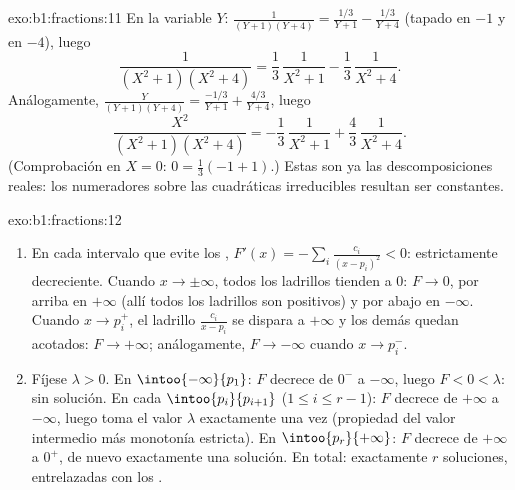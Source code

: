 \begin{solution}{exo:b1:fractions:11}
En la variable $Y$: $\frac1{(Y+1)(Y+4)} = \frac{1/3}{Y+1} -
\frac{1/3}{Y+4}$ (tapado en $-1$ y en $-4$), luego
\[
\frac{1}{(X^2+1)(X^2+4)}
= \frac13\,\frac1{X^2+1} - \frac13\,\frac1{X^2+4} .
\]
Análogamente, $\frac{Y}{(Y+1)(Y+4)} = \frac{-1/3}{Y+1} +
\frac{4/3}{Y+4}$, luego
\[
\frac{X^2}{(X^2+1)(X^2+4)}
= -\frac13\,\frac1{X^2+1} + \frac43\,\frac1{X^2+4} .
\]
(Comprobación en $X = 0$: $0 = \frac13(-1 + 1)$.) Estas son ya las
descomposiciones reales: los numeradores sobre las cuadráticas
irreducibles resultan ser constantes.
\end{solution}

\begin{solution}{exo:b1:fractions:12}
\begin{enumerate}
  \item En cada intervalo que evite los ,
        $F'(x) = -\sum_i \frac{c_i}{(x - p_i)^2} < 0$: estrictamente
        decreciente. Cuando $x \to \pm\infty$, todos los ladrillos
        tienden a $0$: $F \to 0$, por arriba en $+\infty$ (allí todos
        los ladrillos son positivos) y por abajo en $-\infty$. Cuando
        $x \to p_i^+$, el ladrillo $\frac{c_i}{x - p_i}$ se dispara a
        $+\infty$ y los demás quedan acotados: $F \to +\infty$;
        análogamente, $F \to -\infty$ cuando $x \to p_i^-$.
  \item Fíjese $\lambda > 0$. En $\intoo{-\infty}{p_1}$: $F$ decrece
        de $0^-$ a $-\infty$, luego $F < 0 < \lambda$: sin solución.
        En cada $\intoo{p_i}{p_{i+1}}$ ($1 \leq i \leq r-1$): $F$
        decrece de $+\infty$ a $-\infty$, luego toma el valor
        $\lambda$ exactamente una vez (propiedad del valor intermedio
        más monotonía estricta). En $\intoo{p_r}{+\infty}$: $F$ decrece
        de $+\infty$ a $0^+$, de nuevo exactamente una solución. En
        total: exactamente $r$ soluciones, entrelazadas con los .
\end{enumerate}
\end{solution}

